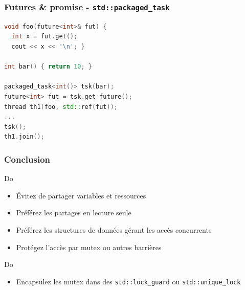 \documentclass[C++.tex]{subfiles}
\begin{document}
\begin{frame}[fragile]
	\frametitle{Futures \& promise - \lstinline|std::packaged_task|}
	\begin{lstlisting}[language=C++]
void foo(future<int>& fut) {
  int x = fut.get();
  cout << x << '\n'; }

int bar() { return 10; }

packaged_task<int()> tsk(bar);
future<int> fut = tsk.get_future();
thread th1(foo, std::ref(fut));
...
tsk();
th1.join();\end{lstlisting}
\end{frame}

\begin{frame}[fragile]
	\frametitle{Conclusion}
	\begin{exampleblock}{Do}
		\begin{itemize}
			\item Évitez de partager variables et ressources
			\item Préférez les partages en lecture seule
			\item Préférez les structures de données gérant les accès concurrents


			\item Protégez l'accès par mutex ou autres barrières


		\end{itemize}


	\end{exampleblock}

	\begin{exampleblock}{Do}
		\begin{itemize}
			\item Encapsulez les mutex dans des \lstinline|std::lock_guard| ou \lstinline|std::unique_lock|
		\end{itemize}
	\end{exampleblock}
\end{frame}
\end{document}
